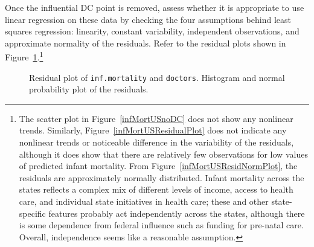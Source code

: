 \begin{exercise}Once the influential DC point is removed, assess whether it is appropriate to use linear regression on these data by checking the four assumptions behind least squares regression: linearity, constant variability, independent observations, and approximate normality of the residuals. Refer to the residual plots shown in Figure~\ref{infMortUSResid}.\footnote{The scatter plot in Figure~\ref{infMortUSnoDC} does not show any nonlinear trends. Similarly, Figure~\ref{infMortUSResidualPlot} does not indicate any nonlinear trends or noticeable difference in the variability of the residuals, although it does show that there are relatively few observations for low values of predicted infant mortality. From Figure~\ref{infMortUSResidNormPlot}, the residuals are approximately normally distributed. Infant mortality across the states reflects a complex mix of different levels of income, access to health care, and individual state initiatives in health care; these and other state-specific features probably act independently across the states, although there is some dependence from federal influence such as funding for pre-natal care. Overall, independence seems like a reasonable assumption.} 

\begin{figure}[h!]
	\centering
	\caption{ Residual plot of \texttt{inf.mortality} and \texttt{doctors}.  Histogram and normal probability plot of the residuals.}
	\label{infMortUSResid}
\end{figure}

\label{exampleInfantMortalityAssumptions}
\end{exercise}

